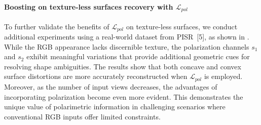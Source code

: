 \paragraph{Boosting on texture-less surfaces recovery with $\mathcal{L}_{pol}$}
To further validate the benefits of $\mathcal{L}_{pol}$ on texture-less surfaces, we conduct additional experiments using a real-world dataset from PISR~[{\color{iccvblue}5}], as shown in . While the RGB appearance lacks discernible texture, the polarization channels $s_1$ and $s_2$ exhibit meaningful variations that provide additional geometric cues for resolving shape ambiguities. The results show that both concave and convex surface distortions are more accurately reconstructed when $\mathcal{L}_{pol}$ is employed. Moreover, as the number of input views decreases, the advantages of incorporating polarization become even more evident. This demonstrates the unique value of polarimetric information in challenging scenarios where conventional RGB inputs offer limited constraints.



